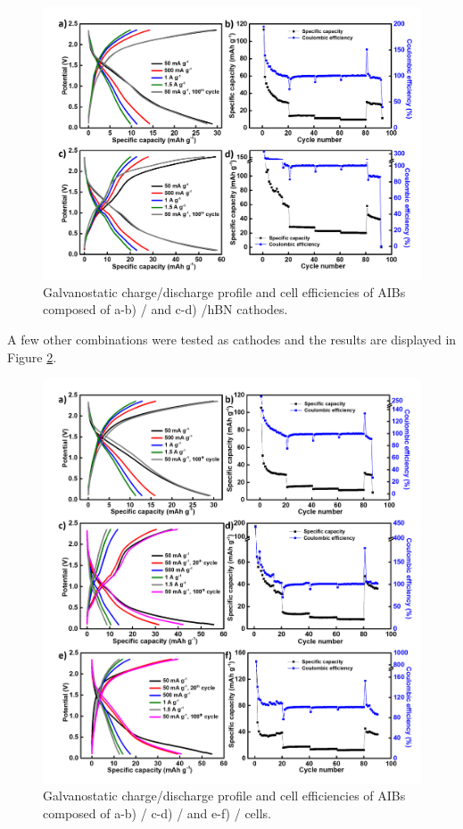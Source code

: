 \begin{figure}[tbh!]
\centering
\includegraphics[width=\textwidth]{Figures/BOhBN/BNdifO}
\caption{Galvanostatic charge/discharge profile and cell efficiencies of AIBs composed of a-b) / and c-d) /hBN cathodes.}
\label{Figures/BOhBN:BNdifO}
\end{figure}

A few other combinations were tested as cathodes and the results are displayed in Figure \ref{Figures/BOhBN:othON}.

\begin{figure}[tbh!]
\centering
\includegraphics[width=\textwidth]{Figures/BOhBN/othON}
\caption{Galvanostatic charge/discharge profile and cell efficiencies of AIBs composed of a-b) / c-d) / and e-f) / cells.}
\label{Figures/BOhBN:othON}
\end{figure}

